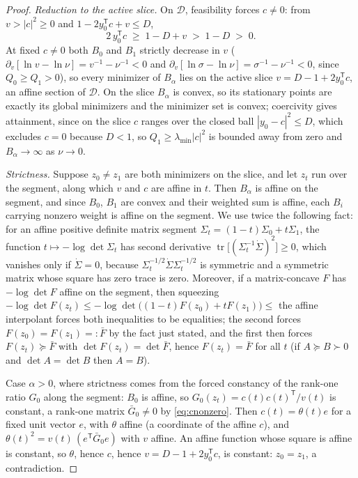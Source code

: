 \documentclass[11pt,onecolumn]{IEEEtran}
\newcommand{\tr}{\operatorname{tr}}
\begin{document}
\begin{proof}
\emph{Reduction to the active slice.} On $\mathcal D$, feasibility
forces $c\ne0$: from $v>|c|^2\ge0$ and
$1-2y_0^{\mathsf T}c+v\le D$,
\begin{equation}
2\,y_0^{\mathsf T}c\;\ge\;1-D+v\;>\;1-D\;>\;0 .
\label{eq:cnonzero}
\end{equation}
At fixed $c\ne0$ both $B_0$ and $B_1$ strictly decrease in $v$
($\partial_v[\ln v-\ln \nu]=v^{-1}-\nu^{-1}<0$ and
$\partial_v[\ln\sigma-\ln \nu]=\sigma^{-1}-\nu^{-1}<0$, since
$Q_0\ge Q_1>0$), so every minimizer of $B_\alpha$ lies on the active
slice $v=D-1+2y_0^{\mathsf T}c$, an affine section of $\mathcal D$. On
the slice $B_\alpha$ is convex, so its stationary points are exactly
its global minimizers and the minimizer set is convex; coercivity gives
attainment, since on the slice $c$ ranges over the closed ball
$|y_0-c|^2\le D$, which excludes $c=0$ because $D<1$, so
$Q_1\ge\lambda_{\min}|c|^2$ is bounded away from zero and
$B_\alpha\to\infty$ as $\nu\to0$.

\emph{Strictness.} Suppose $z_0\ne z_1$ are both minimizers on the
slice, and let $z_t$ run over the segment, along which $v$ and $c$ are
affine in $t$. Then $B_\alpha$ is affine on the segment, and since
$B_0$, $B_1$ are convex and their weighted sum is affine, each $B_i$
carrying nonzero weight is affine on the segment. We use twice the
following fact: for an affine positive definite matrix segment
$\Sigma_t=(1-t)\Sigma_0+t\Sigma_1$, the function
$t\mapsto-\log\det\Sigma_t$ has second derivative
$\tr\bigl[(\Sigma_t^{-1}\dot\Sigma)^2\bigr]\ge0$, which vanishes only
if $\dot\Sigma=0$, because
$\Sigma_t^{-1/2}\dot\Sigma\Sigma_t^{-1/2}$ is symmetric and a
symmetric matrix whose square has zero trace is zero. Moreover, if a
matrix-concave $F$ has $-\log\det F$ affine on the segment, then
squeezing
$-\log\det F(z_t)\le-\log\det\bigl((1-t)F(z_0)+tF(z_1)\bigr)\le$
the affine interpolant forces both inequalities to be equalities;
the second forces $F(z_0)=F(z_1)=:\bar F$ by the fact just stated,
and the first then forces $F(z_t)\succeq\bar F$ with
$\det F(z_t)=\det\bar F$, hence $F(z_t)=\bar F$ for all $t$
(if $A\succeq B\succ0$ and $\det A=\det B$ then $A=B$).

Case $\alpha>0$, where strictness comes from the forced constancy of
the rank-one ratio $G_0$ along the segment: $B_0$ is affine, so
$G_0(z_t)=c(t)c(t)^{\mathsf T}/v(t)$ is constant, a rank-one matrix
$\bar G_0\ne0$ by \eqref{eq:cnonzero}. Then $c(t)=\theta(t)e$ for a fixed unit vector
$e$, with $\theta$ affine (a coordinate of the affine $c$), and
$\theta(t)^2=v(t)\,(e^{\mathsf T}\bar G_0e)$ with $v$ affine. An
affine function whose square is affine is constant, so $\theta$, hence
$c$, hence $v=D-1+2y_0^{\mathsf T}c$, is constant: $z_0=z_1$, a
contradiction.


\end{proof}
\end{document}
